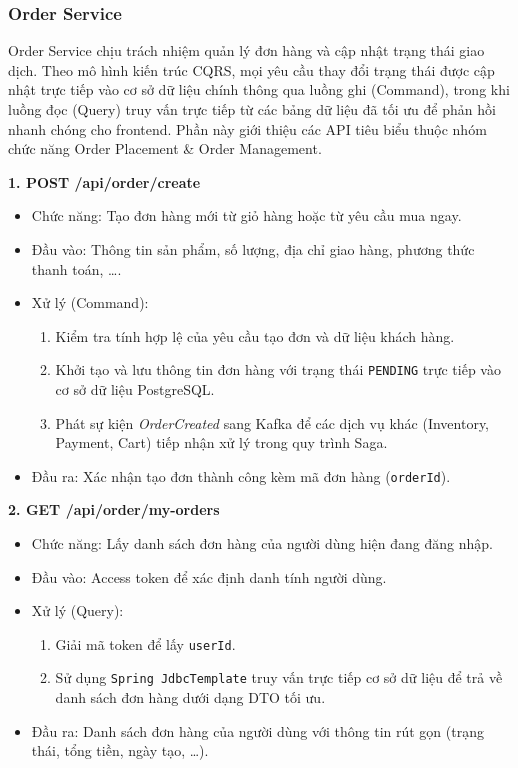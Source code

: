\subsubsection{Order Service}

Order Service chịu trách nhiệm quản lý đơn hàng và cập nhật trạng thái giao dịch. Theo mô hình kiến trúc CQRS, mọi yêu cầu thay đổi trạng thái được cập nhật trực tiếp vào cơ sở dữ liệu chính thông qua luồng ghi (Command), trong khi luồng đọc (Query) truy vấn trực tiếp từ các bảng dữ liệu đã tối ưu để phản hồi nhanh chóng cho frontend. Phần này giới thiệu các API tiêu biểu thuộc nhóm chức năng Order Placement \& Order Management.

\textbf{1. POST /api/order/create}
\begin{itemize}
    \item Chức năng: Tạo đơn hàng mới từ giỏ hàng hoặc từ yêu cầu mua ngay.
    \item Đầu vào: Thông tin sản phẩm, số lượng, địa chỉ giao hàng, phương thức thanh toán, \ldots.
    \item Xử lý (Command):
    \begin{enumerate}
        \item Kiểm tra tính hợp lệ của yêu cầu tạo đơn và dữ liệu khách hàng.
        \item Khởi tạo và lưu thông tin đơn hàng với trạng thái \texttt{PENDING} trực tiếp vào cơ sở dữ liệu PostgreSQL.
        \item Phát sự kiện \textit{OrderCreated} sang Kafka để các dịch vụ khác (Inventory, Payment, Cart) tiếp nhận xử lý trong quy trình Saga.
    \end{enumerate}
    \item Đầu ra: Xác nhận tạo đơn thành công kèm mã đơn hàng (\texttt{orderId}).
\end{itemize}

\textbf{2. GET /api/order/my-orders}
\begin{itemize}
    \item Chức năng: Lấy danh sách đơn hàng của người dùng hiện đang đăng nhập.
    \item Đầu vào: Access token để xác định danh tính người dùng.
    \item Xử lý (Query):
    \begin{enumerate}
        \item Giải mã token để lấy \texttt{userId}.
        \item Sử dụng \texttt{Spring JdbcTemplate} truy vấn trực tiếp cơ sở dữ liệu để trả về danh sách đơn hàng dưới dạng DTO tối ưu.
    \end{enumerate}
    \item Đầu ra: Danh sách đơn hàng của người dùng với thông tin rút gọn (trạng thái, tổng tiền, ngày tạo, \ldots).
\end{itemize}

